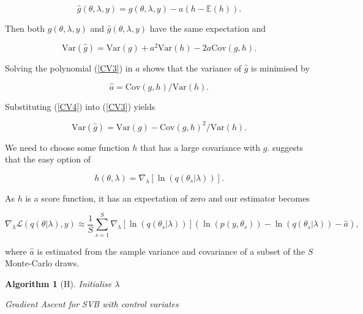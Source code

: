 \documentclass{article}\usepackage[]{graphicx}\usepackage[]{color}
\newtheorem{algorithm}[theorem]{Algorithm}
\begin{document}
\begin{equation}
\label{CV2}
\hat{g}(\theta, \lambda, y) = g(\theta, \lambda, y) - a(h - \mathbb{E}(h)).
\end{equation}

Then both $g(\theta, \lambda, y)$ and $\hat{g}(\theta, \lambda, y)$ have the same expectation and

\begin{equation}
\label{CV3}
\mbox{Var}(\hat{g}) = \mbox{Var}(g) + a^2 \mbox{Var}(h) - 2a\mbox{Cov}(g, h). 
\end{equation}

Solving the polynomial (\ref{CV3}) in $a$ shows that the variance of $\hat{g}$ is minimised by 

\begin{equation}
\label{CV4}
\hat{a} = \mbox{Cov}(g, h)/\mbox{Var}(h).
\end{equation}

Substituting (\ref{CV4}) into (\ref{CV3}) yields

\begin{equation}
\label{CV5}
\mbox{Var}(\hat{g}) = \mbox{Var}(g) - \mbox{Cov}(g, h)^2/\mbox{Var}(h).
\end{equation}

We need to choose some function $h$ that has a large covariance with $g$. \citet{Ranganath2014} suggests that the easy option of

\begin{equation}
\label{CV6}
h(\theta, \lambda) = \nabla_{\lambda} [\ln(q(\theta_s | \lambda))].
\end{equation}

As $h$ is a score function, it has an expectation of zero and our estimator becomes

\begin{equation}
\label{CV7}
\nabla_{\lambda} \mathcal{L}(q(\theta | \lambda), y) \approx \frac{1}{S}\sum_{s=1}^{S} \nabla_{\lambda} [\ln(q(\theta_s | \lambda))] (\ln (p(y, \theta_s)) - \ln(q(\theta_s | \lambda)) - \hat{a}),
\end{equation}

where $\hat{a}$ is estimated from the sample variance and covariance of a subset of the $S$ Monte-Carlo draws.

\begin{algorithm}[H]
 Initialise $\lambda$\;
 \caption{Gradient Ascent for SVB with control variates}
  \label{alg:algorithm3}
\end{algorithm}
\end{document}
